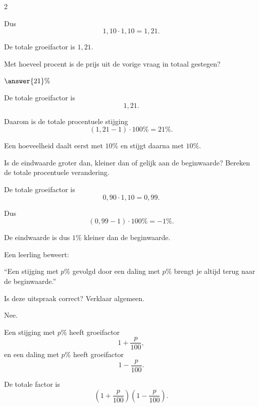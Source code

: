 \documentclass{ximera}
\begin{document}
\begin{oefening}{\oefU\ESS}
\begin{multicols}{2}
\begin{question}
\begin{oplossing}
    Dus
    \[
    1{,}10\cdot1{,}10
    =1{,}21.
    \]
    
    De totale groeifactor is $1{,}21$.
    \end{oplossing}
    \end{question}
    
    
    \begin{question}
    Met hoeveel procent is de prijs uit de vorige vraag in totaal gestegen?
    
    $\answer{21}\%$
    
    \begin{oplossing}
    De totale groeifactor is
    \[
    1{,}21.
    \]
    
    Daarom is de totale procentuele stijging
    \[
    (1{,}21-1)\cdot100\%
    =21\%.
    \]
    \end{oplossing}
    \end{question}
    
    
    \begin{question}
    Een hoeveelheid daalt eerst met $10\%$ en stijgt daarna met $10\%$.
    
    Is de eindwaarde groter dan, kleiner dan of gelijk aan de beginwaarde? Bereken de totale procentuele verandering.
    
    \begin{oplossing}
    De totale groeifactor is
    \[
    0{,}90\cdot1{,}10
    =0{,}99.
    \]
    
    Dus
    \[
    (0{,}99-1)\cdot100\%
    =-1\%.
    \]
    
    De eindwaarde is dus $1\%$ kleiner dan de beginwaarde.
    \end{oplossing}
    \end{question}
    
    
    \begin{question}
    Een leerling beweert:
    
    ``Een stijging met $p\%$ gevolgd door een daling met $p\%$ brengt je altijd terug naar de beginwaarde.''
    
    Is deze uitspraak correct? Verklaar algemeen.
    
    \begin{oplossing}
    Nee.
    
    Een stijging met $p\%$ heeft groeifactor
    \[
    1+\dfrac{p}{100},
    \]
    en een daling met $p\%$ heeft groeifactor
    \[
    1-\dfrac{p}{100}.
    \]
    
    De totale factor is
    \[
    \left(1+\dfrac{p}{100}\right)
    \left(1-\dfrac{p}{100}\right).
    \]
    

\end{oplossing}
\end{question}
\end{multicols}
\end{oefening}
\end{document}
